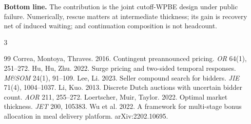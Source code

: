 \documentclass[11pt]{article}
\begin{document}
\noindent\textbf{Bottom line.}
The contribution is the joint cutoff-WPBE design under public failure.
Numerically, rescue matters at intermediate thickness; its gain is recovery
net of induced waiting; and continuation composition is not headcount.

\renewcommand{\bibsection}{\paragraph{References.}}
\begin{multicols}{3}
\fontsize{6.8}{7.4}\selectfont
\raggedcolumns
{}
\setlength{\bibsep}{0pt}
\begin{thebibliography}{99}
 Correa, Montoya, Thraves.
2016. Contingent preannounced pricing. \emph{OR} 64(1), 251--272.
 Hu, Hu, Zhu. 2022. Surge pricing and
two-sided temporal responses. \emph{M\&SOM} 24(1), 91--109.
 Lee, Li. 2023. Seller compound search
for bidders. \emph{JIE} 71(4), 1004--1037.
 Li, Kuo. 2013. Discrete Dutch auctions
with uncertain bidder count. \emph{AOR} 211, 255--272.
 Loertscher, Muir,
Taylor. 2022. Optimal market thickness. \emph{JET} 200, 105383.
 Wu et al. 2022. A framework for
multi-stage bonus allocation in meal delivery platform. arXiv:2202.10695.
\end{thebibliography}
\end{multicols}
\end{document}
